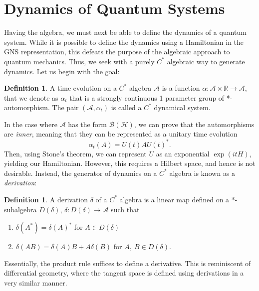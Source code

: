 \documentclass[prb,11pt, nofootinbib]{revtex4-2}
\theoremstyle{definition}
\theoremstyle{definition}
\theoremstyle{definition}
\theoremstyle{definition}
\newtheorem{Definition}[Theorem]{Definition}
\newcommand{\R}{\mathbb{R}}
\newcommand{\note}[1]{{\color{red} {#1}}}
\renewcommand{\note}[1]{{}}
\begin{document}
\section{Dynamics of Quantum Systems}
Having the algebra, we must next be able to define the dynamics of a quantum system. While it is possible to define the dynamics using a Hamiltonian in the GNS representation, this defeats the purpose of the algebraic approach to quantum mechanics. Thus, we seek with a purely $C^*$ algebraic way to generate dynamics. Let us begin with the goal:

\begin{Definition}
	A time evolution on a $C^*$ algebra $\mathcal{A}$ is a function $\alpha: \mathcal{A}\times \R\to \mathcal{A}$, that we denote as $\alpha_t$ that is a strongly continuous 1 parameter group of *-automorphism. The pair $(\mathcal{A}, \alpha_t)$ is called a $C^*$ dynamical system.\note{ If it's not a star automorphism, you cannot prove that the time derivative is a derivation}
\end{Definition}

In the case where $\mathcal{A}$ has the form $\mathcal{B}(\mathcal{H})$, we can prove that the automorphisms are \emph{inner}, meaning that they can be represented as a unitary time evolution
\[
\alpha_t(A) = U(t)AU(t)^*
.\] 
Then, using Stone's theorem, we can represent $U$ as an exponential $\exp(itH)$, yielding our Hamiltonian. However, this requires a Hilbert space, and hence is not desirable. Instead, the generator of dynamics on a $C^*$ algebra is known as a \emph{derivation}:
\begin{Definition}
	A derivation $\delta$ of a $C^*$ algebra is a linear map defined on a *-subalgebra $D(\delta)$, $\delta:D(\delta)\to \mathcal{A}$ such that
	\begin{enumerate}
		\item $\delta(A^*)=\delta(A)^*$ for $A\in D(\delta)$ 
		\item $\delta(AB)=\delta(A)B+A\delta(B)$ for $A,~B\in D(\delta)$.
	\end{enumerate}
\end{Definition}
Essentially, the product rule suffices to define a derivative. This is reminiscent of differential geometry, where the tangent space is defined using derivations in a very similar manner. 
\end{document}
